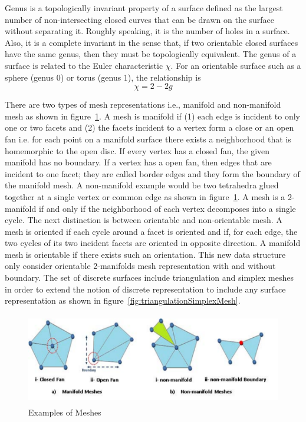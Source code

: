 \documentclass{InsightArticle}
\begin{document}
Genus is a topologically invariant property of a surface defined as the largest number of non-intersecting closed curves that can be drawn on the surface without separating it. Roughly speaking, it is the number of holes in a surface. Also, it is a complete invariant in the sense that, if two orientable closed surfaces have the same genus, then they must be topologically equivalent. The genus of a surface is related to the Euler characteristic $\chi$. For an orientable surface such as a sphere (genus 0) or torus (genus 1), the relationship is
\begin{equation}
\chi = 2 - 2g
\end{equation}

There are two types of mesh representations i.e., manifold and non-manifold mesh as shown in figure~\ref{fig:meshes}. A mesh is manifold if (1) each edge is incident to only one or two facets and (2) the facets incident to a vertex form a close or an open fan i.e. for each point on a manifold surface there exists a neighborhood that is homemorphic to the open disc. If every vertex has a closed fan, the given manifold has no boundary. If a vertex has a open fan, then edges that are incident to one facet; they are called border edges and they form the boundary of the manifold mesh. A non-manifold example would be two tetrahedra glued together at a single vertex or common edge as shown in figure~\ref{fig:meshes}. A mesh is a 2-manifold if and only if the neighborhood of each vertex decomposes into a single cycle. The next distinction is between orientable and non-orientable mesh. A mesh is oriented if each cycle around a facet is oriented and if, for each edge, the two cycles of its two incident facets are oriented in opposite direction. A manifold mesh is orientable if there exists such an orientation. This new data structure only consider orientable 2-manifolds mesh representation with and without boundary. The set of discrete surfaces include triangulation and simplex meshes in order to extend the notion of discrete representation to include any surface representation as shown in figure~\ref{fig:triangulationSimplexMesh}.
\begin{figure}[!t]
	\centering
	\includegraphics[width=155mm, height=40mm]{Meshes}
	\caption{Examples of Meshes}
	\label{fig:meshes}
\end{figure}
\end{document}
